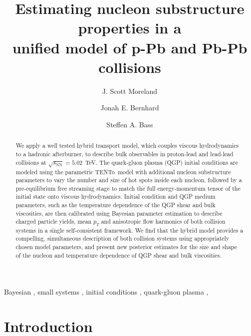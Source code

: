 \documentclass[3p,times,procedia,sort&compress]{elsarticle}
\newcommand{\trento}{T\raisebox{-0.3ex}{R}ENTo}
\newcommand{\sqrts}{\sqrt{s_\mathrm{NN}}}
\begin{document}
\begin{frontmatter}


\title{Estimating nucleon substructure properties in a\\unified model of p-Pb and Pb-Pb collisions}

\author{J. Scott Moreland}
\author{Jonah E. Bernhard}
\author{Steffen A. Bass}

\address{Department of Physics, Duke University, Durham, NC 27708-0305}

\begin{abstract}
  We apply a well tested hybrid transport model, which couples viscous hydrodynamics to a hadronic afterburner, to describe bulk observables in proton-lead and lead-lead collisions at \mbox{$\sqrts=5.02$~TeV}.
  The quark-gluon plasma (QGP) initial conditions are modeled using the parametric \trento\ model with additional nucleon substructure parameters to vary the number and size of hot spots inside each nucleon, followed by a pre-equilibrium free streaming stage to match the full energy-momentum tensor of the initial state onto viscous hydrodynamics.
  Initial condition and QGP medium parameters, such as the temperature dependence of the QGP shear and bulk viscosities, are then calibrated using Bayesian parameter estimation to describe charged particle yields, mean $p_T$ and anisotropic flow harmonics of both collision systems in a single self-consistent framework.
  We find that the hybrid model provides a compelling, simultaneous description of both collision systems using appropriately chosen model parameters, and present new posterior estimates for the size and shape of the nucleon and temperature dependence of QGP shear and bulk viscosities.
\end{abstract}

\begin{keyword}
  Bayesian \sep
  small systems \sep
  initial conditions \sep
  quark-gluon plasma \sep
\end{keyword}

\end{frontmatter}

\section{Introduction}
\end{document}
